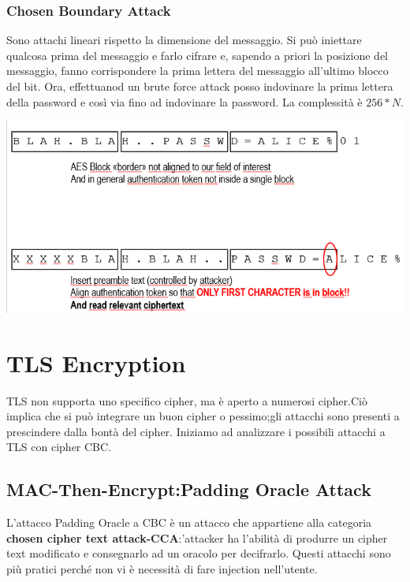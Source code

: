 \documentclass{book}
\theoremstyle{remark}
\begin{document}
\subsection{Chosen Boundary Attack}
Sono attachi lineari rispetto la dimensione del messaggio\@. Si può iniettare qualcosa prima del messaggio e farlo cifrare e, sapendo a priori la posizione del messaggio, fanno corrispondere la prima lettera del messaggio all'ultimo blocco del bit\@. Ora, effettuanod un brute force attack posso indovinare la prima lettera della password e così via fino ad indovinare la password\@. La complessità è \(256*N\)\@.
\begin{center}
	\includegraphics[scale=0.5]{CBA.png}
\end{center}
\chapter{TLS Encryption}
TLS non supporta uno specifico cipher, ma è aperto a numerosi cipher\@.Ciò implica che si può integrare un buon cipher o pessimo;\@tuttavia gli attacchi sono presenti a prescindere dalla bontà del cipher\@. \newline
Iniziamo ad analizzare i possibili attacchi a TLS con cipher CBC\@.
\section{MAC-Then-Encrypt:\@CBC Padding Oracle Attack}
L'attacco Padding Oracle a CBC è un attacco che appartiene alla categoria \textbf{chosen cipher text attack-CCA}:\@l'attacker ha l'abilità di produrre un cipher text modificato e consegnarlo ad un oracolo per decifrarlo\@. Questi attacchi sono più pratici perché non vi è necessità di fare injection nell'utente\@.
\end{document}
